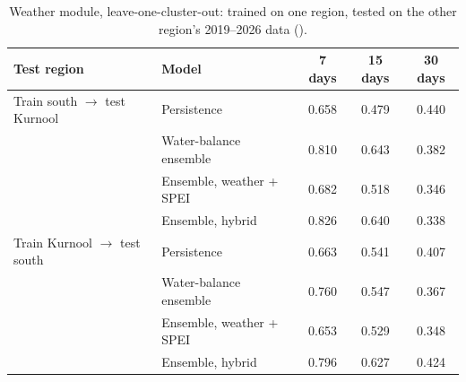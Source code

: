 \begin{table}[H]
\centering
\caption{Weather module, leave-one-cluster-out: trained on one region, tested on the other region's 2019--2026 data (\mf).}
\label{tab:w_loco}
\footnotesize
\begin{tabular}{@{}llccc@{}}
\toprule
\textbf{Test region} & \textbf{Model} & \textbf{7 days} & \textbf{15 days} & \textbf{30 days} \\
\midrule
Train south $\rightarrow$ test Kurnool & Persistence & 0.658 & 0.479 & 0.440 \\
 & Water-balance ensemble & 0.810 & 0.643 & 0.382 \\
 & Ensemble, weather + SPEI & 0.682 & 0.518 & 0.346 \\
 & Ensemble, hybrid & 0.826 & 0.640 & 0.338 \\
\midrule
Train Kurnool $\rightarrow$ test south & Persistence & 0.663 & 0.541 & 0.407 \\
 & Water-balance ensemble & 0.760 & 0.547 & 0.367 \\
 & Ensemble, weather + SPEI & 0.653 & 0.529 & 0.348 \\
 & Ensemble, hybrid & 0.796 & 0.627 & 0.424 \\
\bottomrule
\end{tabular}
\end{table}
